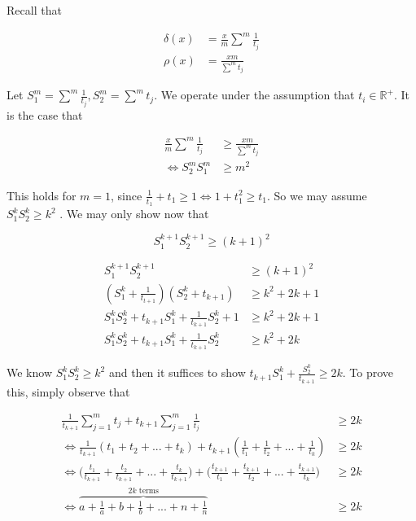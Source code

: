 \documentclass{article}
\begin{document}
\begin{multicols}{2}
Recall that

                \begin{align} \delta(x) &=
                \frac{x}{m}\sum^m\frac{1}{t_j} \\ \rho(x) &=
            \frac{xm}{\sum^m t_j} \end{align}


            Let $S_1^m = \sum^m\frac{1}{t_j}, S_2^m= \sum^m
            t_j$. We operate under the assumption that $t_i
            \in \mathbb{R}^+$. It is the case that

                    \begin{align}
                    \frac{x}{m}\sum^m\frac{1}{t_j} &\geq
                \frac{xm}{\sum^m t_j} \\ \iff S_2^mS_1^m
                                                   &\geq m^2
                \end{align}

                This holds for $m=1$, since
                $\frac{1}{t_1}+t_1 \geq 1 \iff 1+t_1^2 \geq
                t_1$. So we may assume $S^k_1 S^k_2 \geq
                k^2$ . We may only show now that



                \begin{equation} S^{k+1}_1 S^{k+1}_2 \geq
                (k+1)^2 \end{equation}

                    \begin{align} S^{k+1}_1 S^{k+1}_2 &\geq
                        (k+1)^2 \\
                        (S_1^k+\frac{1}{t_{t+1}})(S_2^k+t_{k+1})
                        &\geq k^2+2k+1 \\ S^k_1S^k_2+
                        t_{k+1}S_1^k +
                        \frac{1}{t_{k+1}}S^k_2+1 &\geq
                        k^2+2k+1 \\ S^k_1S^k_2+ t_{k+1}S_1^k
                    + \frac{1}{t_{k+1}}S^k_2 &\geq k^2+2k
                \end{align}

                We know $S^k_1S^k_2 \geq k^2$ and then it
                suffices to show $t_{k+1}S_1^k +
                \frac{S^k_2}{t_{k+1}}\geq 2k$. To prove
                this, simply observe that

                        \begin{align}\frac{1}{t_{k+1}}\sum_{j=1}^mt_j+t_{k+1}\sum_{j=1}^m\frac{1}{t_{j}}
                        &\geq 2k \\
                        \iff\frac{1}{t_{k+1}}(t_1+t_2+...+t_k)+t_{k+1}(\frac{1}{t_1}+\frac{1}{t_2}+...+\frac{1}{t_k})
                        &\geq 2k \\ \iff
                        \Big(\frac{t_1}{t_{k+1}}+\frac{t_2}{t_{k+1}}+...+\frac{t_k}{t_{k+1}}\Big)+\Big(\frac{t_{k+1}}{t_1}+\frac{t_{k+1}}{t_2}+...+\frac{t_{k+1}}{t_k}\Big)
                        &\geq 2k \\ \iff
                        \overbrace{a+\frac{1}{a}+b+\frac{1}{b}+...
                    + n+\frac{1}{n}}^{\text{$2k$ terms} }
                        &\geq 2k \end{align}


\end{multicols}
\end{document}
